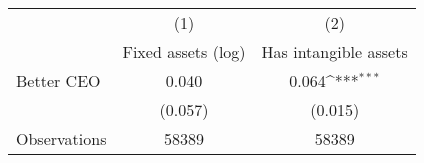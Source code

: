 {
\def\sym#1{\ifmmode^{#1}\else\(^{#1}\)\fi}
\begin{tabular}{l*{2}{c}}
\hline\hline
                    &\multicolumn{1}{c}{(1)}&\multicolumn{1}{c}{(2)}\\
                    &\multicolumn{1}{c}{Fixed assets (log)}&\multicolumn{1}{c}{Has intangible assets}\\
\hline
Better CEO          &       0.040         &       0.064\sym{***}\\
                    &     (0.057)         &     (0.015)         \\
\hline
Observations        &       58389         &       58389         \\
\hline\hline
\end{tabular}
}
